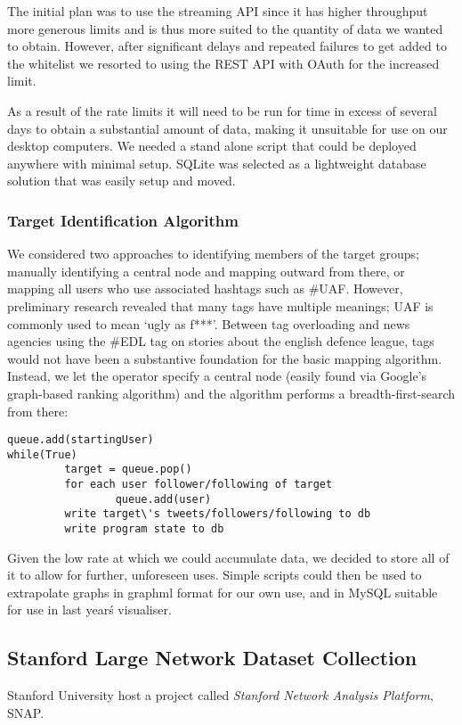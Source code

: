 The initial plan was to use the streaming API since it has higher throughput more generous limits and is thus more suited to the quantity of data we wanted to obtain. However, after significant delays and repeated failures to get added to the whitelist we resorted to using the REST API with OAuth for the increased limit.

As a result of the rate limits it will need to be run for time in excess of several days to obtain a substantial amount of data, making it unsuitable for use on our desktop computers. We needed a stand alone script that could be deployed anywhere with minimal setup. SQLite was selected as a lightweight database solution that was easily setup and moved.

\subsubsection{Target Identification Algorithm}
We considered two approaches to identifying members of the target groups; manually identifying a central node and mapping outward from there, or mapping all users who use associated hashtags such as \#UAF. However, preliminary research revealed that many tags have multiple meanings; UAF is commonly used to mean `ugly as f***'. Between tag overloading and news agencies using the \#EDL tag on stories about the english defence league, tags would not have been a substantive foundation for the basic mapping algorithm. Instead, we let the operator specify a central node (easily found via Google's graph-based ranking algorithm) and the algorithm performs a breadth-first-search from there:

\begin{verbatim}
queue.add(startingUser)
while(True)
         target = queue.pop()
         for each user follower/following of target
                 queue.add(user)
         write target\'s tweets/followers/following to db
         write program state to db
\end{verbatim}

Given the low rate at which we could accumulate data, we decided to store all of it to allow for further, unforeseen uses. Simple scripts could then be used to extrapolate graphs in graphml format for our own use, and in MySQL suitable for use in last year\'s visualiser.

\subsection{Stanford Large Network Dataset Collection}
Stanford University host a project called \emph{Stanford Network Analysis Platform}, SNAP.

